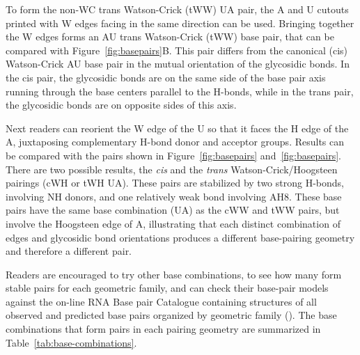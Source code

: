 To form the non-WC trans Watson-Crick (tWW) UA pair, the A and U cutouts printed
with W edges facing in the same direction can be used.  Bringing together the W
edges forms an AU trans Watson-Crick (tWW) base pair, that can be compared with
Figure~\ref{fig:basepairs}B\@. This pair differs from the canonical (cis) Watson-Crick AU base pair
in the mutual orientation of the glycosidic bonds. In the cis pair, the
glycosidic bonds are on the same side of the base pair axis running through the
base centers parallel to the H-bonds, while in the trans pair, the glycosidic
bonds are on opposite sides of this axis.  

Next readers can reorient the W edge of the U so that it faces the H edge of the
A, juxtaposing complementary H-bond donor and acceptor groups. Results can be
compared with the pairs shown in Figure~\ref{fig:basepairs}
and~\ref{fig:basepairs}. There are two possible results, the \emph{cis} and the
\emph{trans} Watson-Crick/Hoogsteen pairings (cWH or tWH UA). These pairs are
stabilized by two strong H-bonds, involving NH donors, and one relatively weak
bond involving AH8. These base pairs have the same base combination (UA) as the
cWW and tWW pairs, but involve the Hoogsteen edge of A, illustrating that each
distinct combination of edges and glycosidic bond orientations produces a
different base-pairing geometry and therefore a different pair. 

Readers are encouraged to try other base combinations, to see how many form
stable pairs for each geometric family, and can check their base-pair models
against the on-line RNA Base pair Catalogue containing structures of all
observed and predicted base pairs organized by geometric family
(). The base combinations that form
pairs in each pairing geometry are summarized in Table~\ref{tab:base-combinations}.

